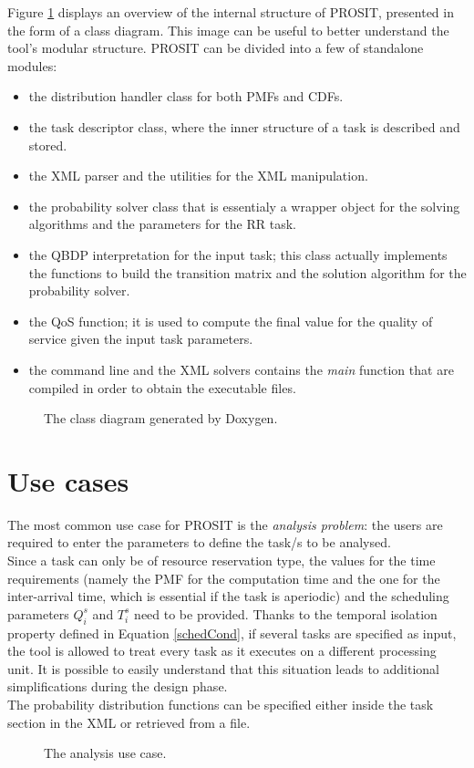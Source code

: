Figure \ref{classdiagram} displays an overview of the internal structure of PROSIT, presented in the form of a class diagram. This image can be useful to better understand the tool's modular structure. PROSIT can be divided into a few of standalone modules:
\begin{itemize}
  \item the distribution handler class for both PMFs and CDFs.
  \item the task descriptor class, where the inner structure of a task is described and stored.
  \item the XML parser and the utilities for the XML manipulation.
  \item the probability solver class that is essentialy a wrapper object for the solving algorithms and the parameters for the RR task.
  \item the QBDP interpretation for the input task; this class actually implements the functions to build the transition matrix and the solution algorithm for the probability solver.
  \item the QoS function; it is used to compute the final value for the quality of service given the input task parameters.
  \item the command line and the XML solvers contains the \emph{main} function that are compiled in order to obtain the executable files.
\end{itemize}   

\begin{figure}[H]
  \caption{The class diagram generated by Doxygen.}
  \label{classdiagram}
\end{figure}

\section{Use cases}
The most common use case for PROSIT is the \emph{analysis problem}: the users are required to enter the parameters to define the task/s to be analysed.\\
Since a task can only be of resource reservation type, the values for the time requirements (namely the PMF for the computation time and the one for the inter-arrival time, which is essential if the task is aperiodic) and the scheduling parameters \( Q_{i}^s \) and \( T_{i}^s \) need to be provided. Thanks to the temporal isolation property defined in Equation \ref{schedCond}, if several tasks are specified as input, the tool is allowed to treat every task as it executes on a different processing unit. It is possible to easily understand that this situation leads to additional simplifications during the design phase.\\ 
The probability distribution functions can be specified either inside the task section in the XML or retrieved from a file.
\begin{figure}[H]
  \caption{The analysis use case.}
  \label{usecase}
\end{figure}


